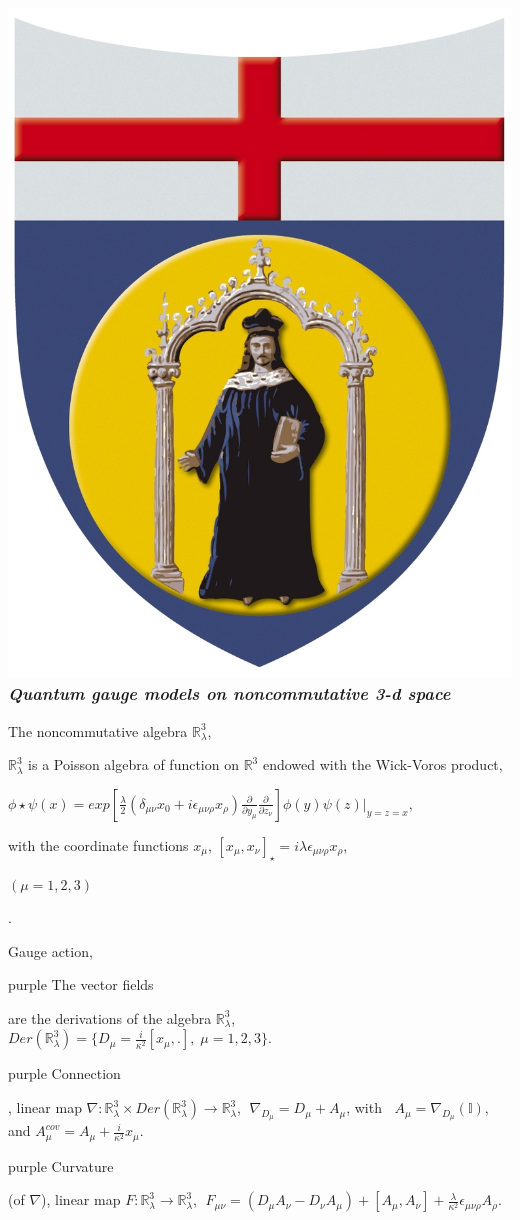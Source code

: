 \documentclass[a4paper,11pt]{beamer} %
\newcommand{\LogoUnivGenova}{\protect\includegraphics[scale=0.015]{fig_genova.JPG}} %
\begin{document}
\begin{frame}
\frametitle{\LogoUnivGenova {} \emph{\small{Quantum gauge models on noncommutative 3-d space}}}
\begin{block}{The noncommutative algebra $\mathbb{R}^3_\lambda$, \; \cite{PJC2013}}
\begin{footnotesize}
$\mathbb{R}^3_\lambda$ is a Poisson algebra of function on $\mathbb{R}^3$ endowed with the Wick-Voros product, \\
\vspace{-4mm}
\begin{center} 
$\phi \star \psi (x) = exp \left[ \frac{\lambda}{2} ( \delta_{\mu \nu} x_0 + i \epsilon_{\mu \nu \rho} x_\rho ) \frac{\partial}{\partial y_\mu} \frac{\partial}{\partial z_\nu} \right] \phi(y) \psi(z) \big|_{y=z=x}$, 
\end{center}
\vspace{-2mm}
with the coordinate functions $x_\mu$, \; $[x_\mu , x_\nu ]_{\star} = i \lambda \epsilon_{\mu \nu \rho} x_{\rho}$, \; \begin{tiny}$(\mu = 1,2,3)$\end{tiny}.
\end{footnotesize}
\end{block}
\vspace{-2mm}
\begin{block}{Gauge action, \;\cite{APJC2013}}
\begin{scriptsize}
\begin{color}{purple} The vector fields \end{color}are the derivations of the algebra $\mathbb{R}^3_\lambda$,\\
$Der(\mathbb{R}^3_\lambda) = \big\{ D_\mu = \frac{i}{\kappa^2} [x_\mu,.], \; \mu = 1,2,3 \big\}$.\\
\begin{color}{purple} Connection \end{color}, linear map $\nabla: \mathbb{R}^3_\lambda \times Der(\mathbb{R}^3_\lambda) \to \mathbb{R}^3_\lambda$, $\; \nabla_{D_\mu} = D_\mu + A_\mu $, \; with $\; \; A_\mu = \nabla_{D_\mu} (\mathbb{I})$, and $A^{cov}_{\mu} = A_\mu + \frac{i}{\kappa^2} x_\mu$. \\
\begin{color}{purple} Curvature \end{color} (of $\nabla$), linear map $F: \mathbb{R}^3_\lambda \to \mathbb{R}^3_\lambda$, $\; F_{\mu \nu} = (D_{\mu} A_{\nu}  -  D_{\nu} A_{\mu}) + [A_{\mu},A_{\nu}] + \frac{\lambda }{\kappa^{2}} \epsilon_{\mu \nu \rho} A_{\rho}$. \\

\end{scriptsize}
\end{block}
\end{frame}
\end{document}
